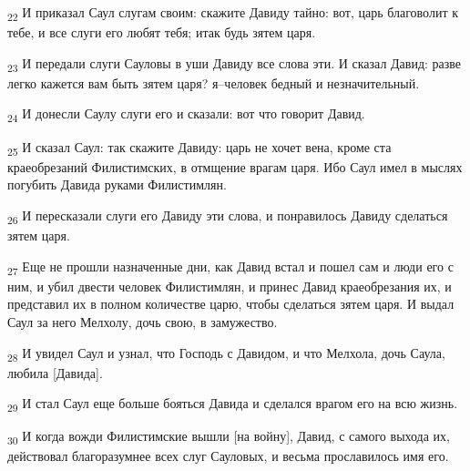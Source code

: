 \begin{tcolorbox}
\textsubscript{22} И приказал Саул слугам своим: скажите Давиду тайно: вот, царь благоволит к тебе, и все слуги его любят тебя; итак будь зятем царя.
\end{tcolorbox}
\begin{tcolorbox}
\textsubscript{23} И передали слуги Сауловы в уши Давиду все слова эти. И сказал Давид: разве легко кажется вам быть зятем царя? я--человек бедный и незначительный.
\end{tcolorbox}
\begin{tcolorbox}
\textsubscript{24} И донесли Саулу слуги его и сказали: вот что говорит Давид.
\end{tcolorbox}
\begin{tcolorbox}
\textsubscript{25} И сказал Саул: так скажите Давиду: царь не хочет вена, кроме ста краеобрезаний Филистимских, в отмщение врагам царя. Ибо Саул имел в мыслях погубить Давида руками Филистимлян.
\end{tcolorbox}
\begin{tcolorbox}
\textsubscript{26} И пересказали слуги его Давиду эти слова, и понравилось Давиду сделаться зятем царя.
\end{tcolorbox}
\begin{tcolorbox}
\textsubscript{27} Еще не прошли назначенные дни, как Давид встал и пошел сам и люди его с ним, и убил двести человек Филистимлян, и принес Давид краеобрезания их, и представил их в полном количестве царю, чтобы сделаться зятем царя. И выдал Саул за него Мелхолу, дочь свою, в замужество.
\end{tcolorbox}
\begin{tcolorbox}
\textsubscript{28} И увидел Саул и узнал, что Господь с Давидом, и что Мелхола, дочь Саула, любила [Давида].
\end{tcolorbox}
\begin{tcolorbox}
\textsubscript{29} И стал Саул еще больше бояться Давида и сделался врагом его на всю жизнь.
\end{tcolorbox}
\begin{tcolorbox}
\textsubscript{30} И когда вожди Филистимские вышли [на войну], Давид, с самого выхода их, действовал благоразумнее всех слуг Сауловых, и весьма прославилось имя его.
\end{tcolorbox}
